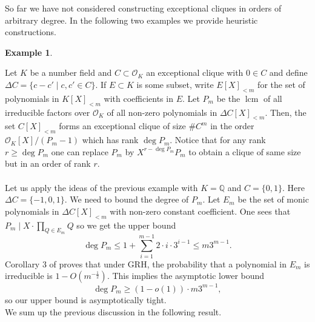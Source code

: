 \documentclass{amsart}
\theoremstyle{plain}
\theoremstyle{definition}
\newtheorem{example}[theorem]{Example}
\DeclareMathOperator{\lcm}{lcm}
\newcommand{\ent}{\mathcal{O}}
\newcommand{\Z}{\ensuremath{\mathbb{Z}}}
\newcommand{\Q}{\ensuremath{\mathbb{Q}}}
\newcommand{\inote}[1]{\textbf{\color{red}Ignacio: #1}}
\begin{document}
So far we have not considered constructing exceptional cliques in orders of arbitrary degree. In the following two examples we provide heuristic constructions. 

\begin{example}\label{ex:general_nf_construction}


Let $K$ be a number field and $C\subset\ent_K$ an exceptional clique with $0\in C$ and define $\Delta C=\{c-c'\mid c,c'\in C\}$. If $E\subset K$ is some subset, write $E[X]_{<m}$ for the set of polynomials in $K[X]_{<m}$ with coefficients in $E$. Let $P_m$ be the $\lcm$ of all irreducible factors over $\ent_K$ of all non-zero polynomials in $\Delta C[X]_{<m}$. Then, the set $C[X]_{<m}$ forms an exceptional clique of size $\# C^m$ in the order $\ent_K[X]/(P_m-1)$ which has rank $\deg P_m$. Notice that for any rank $r\ge \deg P_m$ one can replace $P_m$ by $X^{r-\deg P_m}P_m$ to obtain a clique of same size but in an order of rank $r$.\\
~\\
Let us apply the ideas of the previous example with $K=\Q$ and $C=\{0,1\}$. Here $\Delta C=\{-1,0,1\}$. We need to bound the degree of $P_m$. Let $E_m$ be the set of monic polynomials in $\Delta C[X]_{<m} $ with non-zero constant coefficient. One sees that $P_m\mid X\cdot\prod_{Q\in E_m} Q$ so we get the upper bound $$\deg P_m\le 1+\sum_{i=1}^{m-1} 2\cdot i\cdot 3^{i-1}\le m3^{m-1}.$$ Corollary 3 of \cite{breuillard_varju_2019} proves that under GRH, the probability that a polynomial in $E_m$ is irreducible is $1-O(m^{-\frac{1}{2}})$. This implies the asymptotic lower bound $$\deg P_m\ge (1-o(1))\cdot m3^{m-1},$$ so our upper bound is asymptotically tight.\\
We sum up the previous discussion in the following result.
\end{example}
\end{document}

